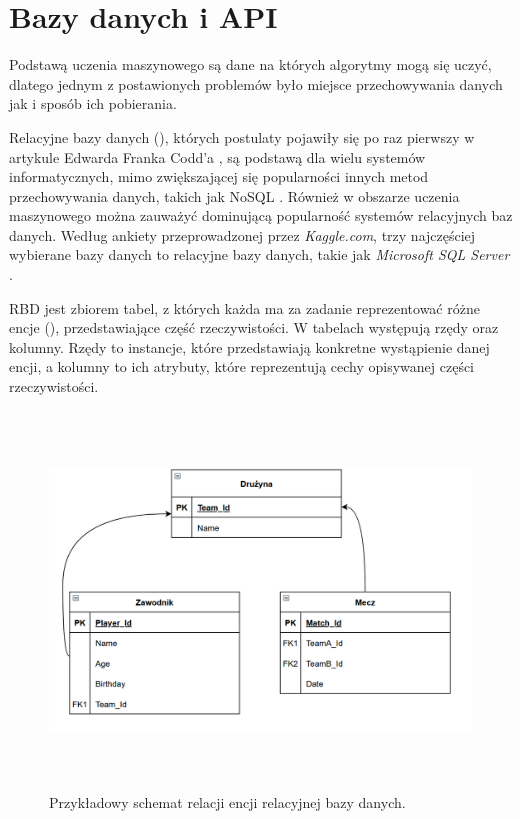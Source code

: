 \section{Bazy danych i API}
Podstawą uczenia maszynowego są dane na których algorytmy mogą się uczyć, dlatego jednym z postawionych problemów było miejsce przechowywania danych jak i sposób ich pobierania.

Relacyjne bazy danych (), których postulaty pojawiły się po raz pierwszy w artykule Edwarda Franka Codd'a \cite{Codd}, są podstawą dla wielu systemów informatycznych, mimo zwiększającej się popularności innych metod przechowywania danych, takich jak NoSQL \cite{RBD_popularity_2016}. Również w obszarze uczenia maszynowego można zauważyć dominującą popularność systemów relacyjnych baz danych. Według ankiety przeprowadzonej przez \textit{Kaggle.com}, trzy najczęściej wybierane bazy danych to relacyjne bazy danych, takie jak \textit{Microsoft SQL Server} \cite{RDB_popularity_kaggle_2020}.

RBD jest zbiorem tabel, z których każda ma za zadanie reprezentować różne encje (), przedstawiające część rzeczywistości. W tabelach występują rzędy oraz kolumny. Rzędy to instancje, które przedstawiają konkretne wystąpienie danej encji, a kolumny to ich atrybuty, które reprezentują cechy opisywanej części rzeczywistości. 

\begin{figure}[h] 
        \centering\includegraphics[width=14cm,height=10cm]{figures/Example_entities.PNG}
        \caption{Przykładowy schemat relacji encji relacyjnej bazy danych.}\label{example-Entity}
\end{figure}

